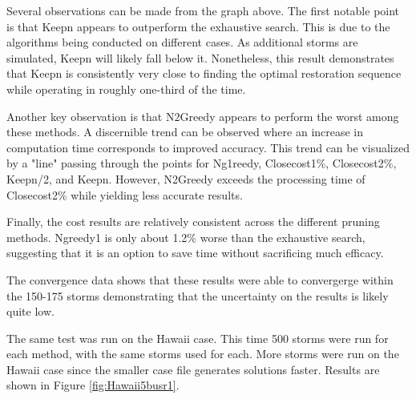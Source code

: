 \documentclass[12pt]{article}
\begin{document}
Several observations can be made from the graph above. The first notable point is that Keepn appears to outperform the exhaustive search. This is due to the algorithms being conducted on different cases. As additional storms are simulated, Keepn will likely fall below it. Nonetheless, this result demonstrates that Keepn is consistently very close to finding the optimal restoration sequence while operating in roughly one-third of the time. \par
Another key observation is that N2Greedy appears to perform the worst among these methods. A discernible trend can be observed where an increase in computation time corresponds to improved accuracy. This trend can be visualized by a "line" passing through the points for Ng1reedy, Closecost1\%, Closecost2\%, Keepn/2, and Keepn. However, N2Greedy exceeds the processing time of Closecost2\% while yielding less accurate results. \par
Finally, the cost results are relatively consistent across the different pruning methods. Ngreedy1 is only about 1.2\% worse than the exhaustive search, suggesting that it is an option to save time without sacrificing much efficacy. \par

The convergence data shows that these results were able to convergerge within the 150-175 storms demonstrating that the uncertainty on the results is likely quite low.\par

The same test was run on the Hawaii case. This time 500 storms were run for each method, with the same storms used for each. More storms were run on the Hawaii case since the smaller case file generates solutions faster. Results are shown in Figure \ref{fig:Hawaii5busr1}.
\end{document}

